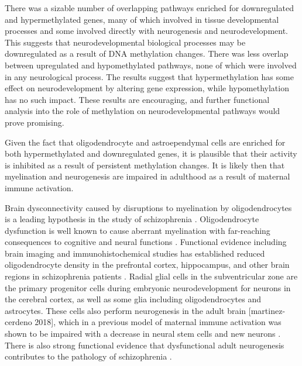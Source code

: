 \documentclass{bioinfo}
\begin{document}
\begin{discussion}
There was a sizable number of overlapping pathways enriched for downregulated and hypermethylated genes, many of which involved in tissue developmental processes and some involved directly with neurogenesis and neurodevelopment. This suggests that neurodevelopmental biological processes may be downregulated as a result of DNA methylation changes. There was less overlap between upregulated and hypomethylated pathways, none of which were involved in any neurological process. The results suggest that hypermethylation has some effect on neurodevelopment by altering gene expression, while hypomethylation has no such impact. These results are encouraging, and further functional analysis into the role of methylation on neurodevelopmental pathways would prove promising.

Given the fact that oligodendrocyte and astroependymal cells are enriched for both hypermethylated and downregulated genes, it is plausible that their activity is inhibited as a result of persistent methylation changes. It is likely then that myelination and neurogenesis are impaired in adulthood as a result of maternal immune activation. 

Brain dysconnectivity caused by disruptions to myelination by oligodendrocytes is a leading hypothesis in the study of schizophrenia \citep{cassoli_disturbed_2015}. Oligodendrocyte dysfunction is well known to cause aberrant myelination with far-reaching consequences to cognitive and neural functions \citep{fields_white_2008}. Functional evidence including brain imaging and immunohistochemical studies has established reduced oligodendrocyte density in the prefrontal cortex, hippocampus, and other brain regions in schizophrenia patients \citep{uranova_oligodendroglial_2004, schmitt_stereologic_2009, vostrikov_deficit_2007}. Radial glial cells in the subventricular zone are the primary progenitor cells during embryonic neurodevelopment for neurons in the cerebral cortex, as well as some glia including oligodendrocytes and astrocytes. These cells also perform neurogenesis in the adult brain [martinez-cerdeno 2018], which in a previous model of maternal immune activation was shown to be impaired with a decrease in neural stem cells and new neurons \citep{liu_effects_2013}. There is also strong functional evidence that dysfunctional adult neurogenesis contributes to the pathology of schizophrenia \citep{iannitelli_schizophrenia_2017}. 


\end{discussion}
\end{document}
